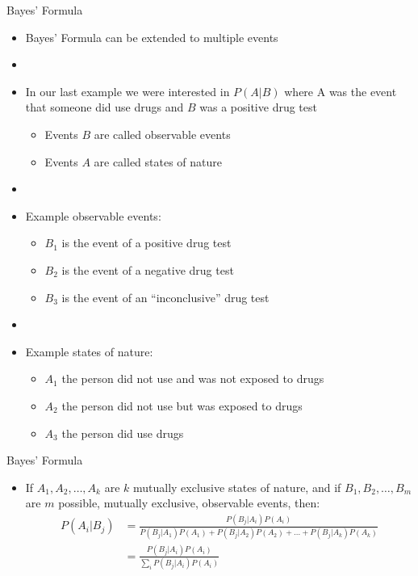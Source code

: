 \documentclass[xcolor=dvipsnames]{beamer}
\begin{document}
\begin{frame}{Bayes' Formula}

\begin{itemize}
	\item Bayes' Formula can be extended to multiple events \pause
	\item[]
	\item In our last example we were interested in $P(A|B)$ where A was the event that someone did use drugs and $B$ was a positive drug test \pause
	\begin{itemize}
		\item Events $B$ are called observable events \pause
		\item Events $A$ are called states of nature \pause
	\end{itemize}
	\item[]
	\item Example observable events:\pause
	\begin{itemize}
		\item $B_1$ is the event of a positive drug test \pause
		\item $B_2$ is the event of a negative drug test \pause
		\item $B_3$ is the event of an ``inconclusive'' drug test \pause
	\end{itemize}
	\item[]
	\item Example states of nature: \pause
	\begin{itemize}
		\item $A_1$ the person did not use and was not exposed to drugs \pause
		\item $A_2$ the person did not use but was exposed to drugs \pause
		\item $A_3$ the person did use drugs
	\end{itemize}
	
\end{itemize}
\end{frame}

\begin{frame}{Bayes' Formula}
	\begin{itemize}
		\item If $A_1, A_2, \hdots, A_k$ are $k$ mutually exclusive states of nature, and if $B_1, B_2, \hdots, B_m$ are $m$ possible, mutually exclusive, observable events, then:\pause
		\begin{align*}
		P(A_i|B_j) &= \frac{P(B_j|A_i)P(A_i)}{P(B_j|A_1)P(A_1) + P(B_j|A_2)P(A_2) + \hdots + P(B_j|A_k)P(A_k)} \\
		&= \frac{P(B_j|A_i)P(A_i)}{\sum_i P(B_j|A_i)P(A_i)}
		\end{align*}
	\end{itemize}
\end{frame}
\end{document}
